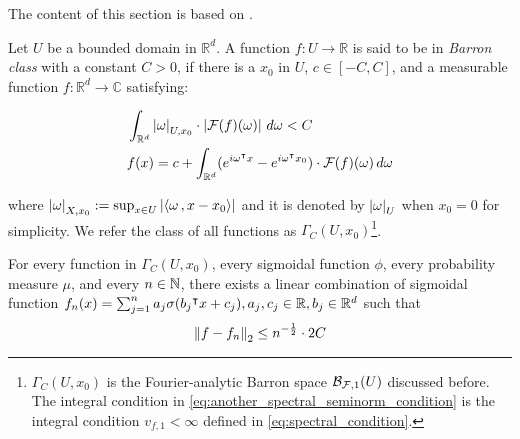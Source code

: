 The content of this section is based on
\cite{barronUniversalApproximationBounds1993}.

\begin{definition}
    \label{def:fourier_class}
    Let $U$ be a bounded domain in $\mathbb{R}^d$. A function $f: U \to
    \mathbb{R}$ is said to be in \textit{Barron class} with a constant $C > 0$,
    if there is a $x_0$ in $U$, $c \in [-C, C]$, and a measurable function $f:
    \mathbb{R}^d \to \mathbb{C}$ satisfying:

    \begin{align}
        & \int_{\mathbb{R}^d} \left| \omega \right|_{U, x_0} 
        \cdot \left| \mathcal{F}(f)(\omega) \right| \,d\omega < C 
        \label{eq:another_spectral_seminorm_condition} \\
        & f(x) = c + \int_{\mathbb{R}^d} (
            e^{i\omega{}^{\intercal} x} - e^{i\omega{}^{\intercal} x_0}
        ) \cdot \mathcal{F}(f)(\omega)\,d\omega
    \end{align}

    where $\left| \omega \right|_{X, x_0} := \sup_{x\in U}\left| \left\langle \omega\, , x - x_0 \right\rangle \right|$
    and it is denoted by $\left| \omega \right|_U$ when $x_0 = 0$ for simplicity. We
    refer the class of all functions as $\Gamma_C(U, x_0)$\footnote{
        $\Gamma_C(U, x_0)$ is the Fourier-analytic Barron space
        $\mathcal{B}_{\mathcal{F}, 1}(U)$ discussed before. The integral condition in
        \eqref{eq:another_spectral_seminorm_condition} is the integral condition
        $v_{f,1} < \infty$ defined in \eqref{eq:spectral_condition}.
    }.
\end{definition}

\begin{theorem}
    \label{thm:barron_1993_1}
    For every function in $\Gamma_C(U, x_0)$, every sigmoidal function $\phi$,
    every probability measure $\mu$, and every $n \in \mathbb{N}$, there exists a
    linear combination of sigmoidal function $f_n(x) = \sum_{j=1}^n a_j
    \sigma(b_j{}^{\intercal} x+c_j), a_j, c_j \in \mathbb{R}, b_j \in \mathbb{R}^d$ such that
    \begin{equation}
        \left\| f - f_n \right\|_2 \leq n^{-\frac{1}{2}} \cdot 2C
    \end{equation}
\end{theorem}


